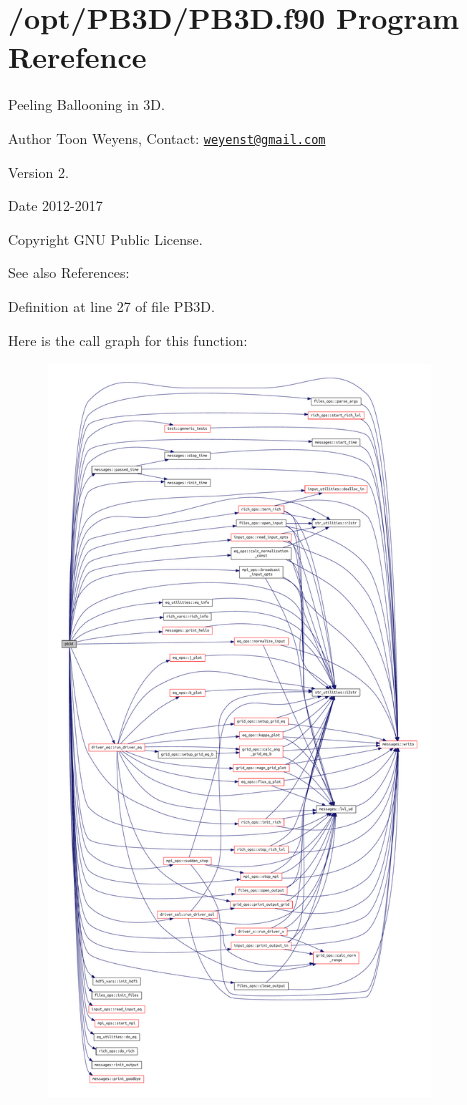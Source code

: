\hypertarget{PB3D_8f90}{}\section{/opt/\+P\+B3\+D/\+P\+B3D.f90 Program Rerefence}
\label{PB3D_8f90}



Peeling Ballooning in 3D. 

\begin{DoxyAuthor}{Author}
Toon Weyens, Contact\+: \href{mailto:weyenst@gmail.com}{\tt weyenst@gmail.\+com} 
\end{DoxyAuthor}
\begin{DoxyVersion}{Version}
2. 
\end{DoxyVersion}
\begin{DoxyDate}{Date}
2012-\/2017 
\end{DoxyDate}
\begin{DoxyCopyright}{Copyright}
G\+NU Public License. 
\end{DoxyCopyright}
\begin{DoxySeeAlso}{See also}
References\+: \cite{weyens2014theory} \cite{Weyens2017PB3D} 
\end{DoxySeeAlso}


Definition at line 27 of file P\+B3\+D.

Here is the call graph for this function\+:\nopagebreak
\begin{figure}[H]
\begin{center}
\leavevmode
\includegraphics[height=550pt]{PB3D_8f90_afaee01f014ab3398eecac996b2795fd2_cgraph}
\end{center}
\end{figure}
